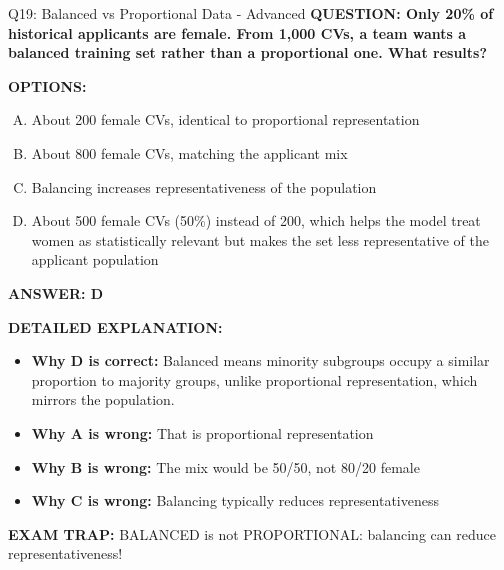 \documentclass[8pt]{beamer}
\begin{document}
\begin{frame}[shrink=6]{Q19: Balanced vs Proportional Data - Advanced}
\fontsize{6.5}{7.5}\selectfont
\textbf{QUESTION: Only 20\% of historical applicants are female. From 1,000 CVs, a team wants a balanced training set rather than a proportional one. What results?}

\vspace{0.1cm}
\textbf{OPTIONS:}
\begin{enumerate}[A.]
\item About 200 female CVs, identical to proportional representation
\item About 800 female CVs, matching the applicant mix
\item Balancing increases representativeness of the population
\item About 500 female CVs (50\%) instead of 200, which helps the model treat women as statistically relevant but makes the set less representative of the applicant population
\end{enumerate}

\vspace{0.1cm}
\textcolor{myblue}{\textbf{ANSWER: D}}

\vspace{0.1cm}
\textbf{DETAILED EXPLANATION:}
\begin{itemize}
\item \textbf{Why D is correct:} Balanced means minority subgroups occupy a similar proportion to majority groups, unlike proportional representation, which mirrors the population.
\item \textbf{Why A is wrong:} That is proportional representation
\item \textbf{Why B is wrong:} The mix would be 50/50, not 80/20 female
\item \textbf{Why C is wrong:} Balancing typically reduces representativeness
\end{itemize}

\textcolor{myred}{\textbf{EXAM TRAP:}} BALANCED is not PROPORTIONAL: balancing can reduce representativeness!
\end{frame}
\end{document}
